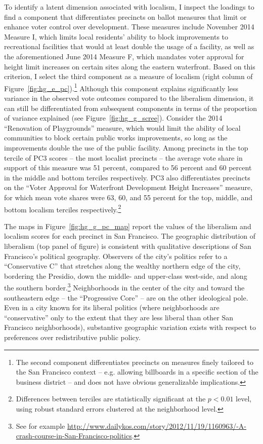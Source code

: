 \documentclass[article,12pt]{memoir}
\begin{document}
To identify a latent dimension associated with localism, I inspect the loadings to find a component that differentiates precincts on ballot measures that limit or enhance voter control over development.  These measures include November 2014 Measure I, which limits local residents' ability to block improvements to recreational facilities that would at least double the usage of a facility, as well as the aforementioned June 2014 Measure F, which mandates voter approval for height limit increases on certain sites along the eastern waterfront.  Based on this criterion, I select the third component as a measure of localism (right column of Figure~\ref{fig:hg_e_pc}).\footnote{The second component differentiates precincts on measures finely tailored to the San Francisco context -- e.g. allowing billboards in a specific section of the business district -- and does not have obvious generalizable implications.} Although this component explains significantly less variance in the observed vote outcomes compared to the liberalism dimension, it can still be differentiated from subsequent components in terms of the proportion of variance explained (see Figure~\ref{fig:hg_g_scree}). Consider the 2014 ``Renovation of Playgrounds'' measure, which would limit the ability of local communities to block certain public works improvements, so long as the improvements double the use of the public facility. Among precincts in the top tercile of PC3 scores -- the most localist precincts -- the average vote share in support of this measure was 51 percent, compared to 56 percent and 60 percent in the middle and bottom terciles respectively. PC3 also differentiates precincts on the ``Voter Approval for Waterfront Development Height Increases'' measure, for which mean vote shares were 63, 60, and 55 percent for the top, middle, and bottom localism terciles respectively.\footnote{Differences between terciles are statistically significant at the $p < 0.01$ level, using robust standard errors clustered at the neighborhood level.}

The maps in Figure~\ref{fig:hg_g_pc_map} report the values of the liberalism and localism scores for each precinct in San Francisco. The geographic distribution of liberalism (top panel of figure) is consistent with qualitative descriptions of San Francisco's political geography. Observers of the city's politics refer to a ``Conservative C'' that stretches along the wealthy northern edge of the city, bordering the Presidio, down the middle- and upper-class west-side, and along the southern border.\footnote{See for example \url{http://www.dailykos.com/story/2012/11/19/1160963/-A-crash-course-in-San-Francisco-politics}.} Neighborhoods in the center of the city and toward the southeastern edge -- the ``Progressive Core'' -- are on the other ideological pole. Even in a city known for its liberal politics (where neighborhoods are ``conservative'' only to the extent that they are less liberal than other San Francisco neighborhoods), substantive geographic variation exists with respect to preferences over redistributive public policy.
\end{document}
